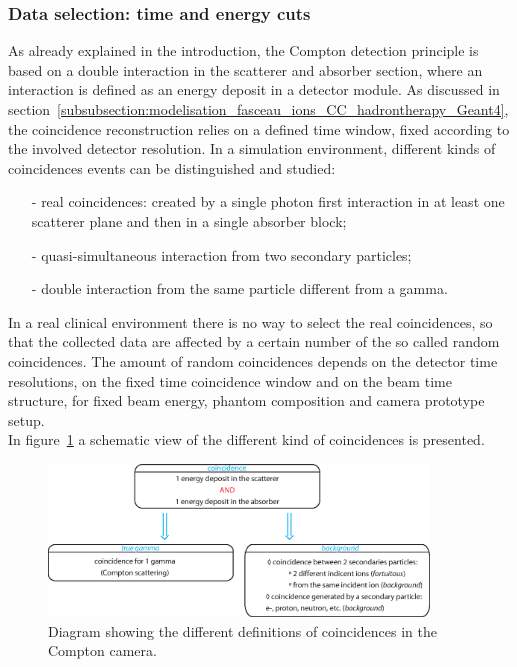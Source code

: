 \newpage
\subsubsection{Data selection: time and energy cuts}

As already explained in the introduction, the Compton detection principle is based on a double interaction in the scatterer and absorber section, where an interaction is defined as an energy deposit in a detector module. As discussed in section~\ref{subsubsection:modelisation_fasceau_ions_CC_hadrontherapy_Geant4}, the coincidence reconstruction relies on a defined time window, fixed according to the involved detector resolution. In a simulation environment, different kinds of coincidences events can be distinguished and studied: 
\begin{itemize}
\item[-] real coincidences: created by a single photon first interaction in at least one scatterer plane and then in a single absorber block;
\item[-] quasi-simultaneous interaction from two secondary particles;
\item[-] double interaction from the same particle different from a gamma.
\end{itemize}
In a real clinical environment there is no way to select the real coincidences, so that the collected data are affected by a certain number of the so called random coincidences. The amount of random coincidences depends on the detector time resolutions, on the fixed time coincidence window and on the beam time structure, for fixed beam energy, phantom composition and camera prototype setup.\\

In figure~\ref{fig:fig_explication_coincidence_CC_simulation_Hadronth} a schematic view of the different kind of coincidences is presented.
	\begin{figure} [!hbtp]	
	\centering
	\includegraphics[width=0.9\textwidth]{./Figure/Schema_coincidence_EN.eps}
	\caption{Diagram showing the different definitions of coincidences in the Compton camera.}
	 \label{fig:fig_explication_coincidence_CC_simulation_Hadronth}
	\end{figure}

